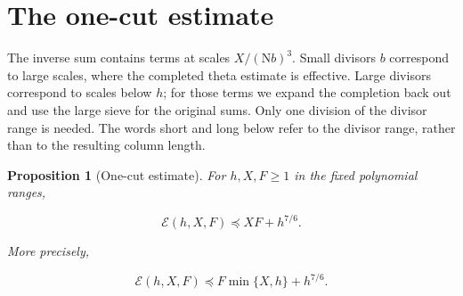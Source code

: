 \documentclass[reqno,a4paper,11pt]{amsart}
\newtheorem{proposition}{Proposition}[section]
\begin{document}
\section{The one-cut estimate}

The inverse sum contains terms at scales $X/(\mathrm{N}b)^3$. Small divisors $b$ correspond to large scales, where the completed theta estimate is effective. Large divisors correspond to scales below $h$; for those terms we expand the completion back out and use the large sieve for the original sums. Only one division of the divisor range is needed. The words short and long below refer to the divisor range, rather than to the resulting column length.

\begin{proposition}[One-cut estimate]

For $h,X,F\ge 1$ in the fixed polynomial ranges,

\begin{equation}\label{eq:13}
\mathcal{E}\left( h,X,F\right) \preccurlyeq XF+{h}^{7/6}.
\end{equation}

More precisely,

\begin{equation}\label{eq:14}
\mathcal{E}\left( h,X,F\right) \preccurlyeq F\min \{X,h\}+{h}^{7/6}.
\end{equation}

\end{proposition}
\end{document}

